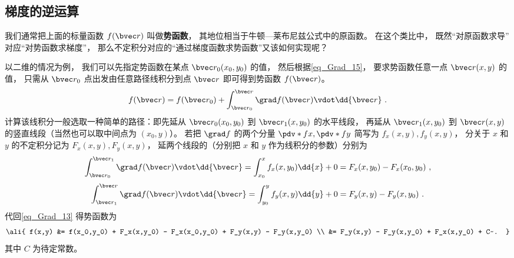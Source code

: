 \subsection{梯度的逆运算}

我们通常把上面的标量函数 $f(\bvec r)$ 叫做\textbf{势函数}， 其地位相当于牛顿—莱布尼兹公式中的原函数。 在这个类比中， 既然“对原函数求导” 对应“对势函数求梯度”， 那么不定积分对应的“通过梯度函数求势函数”又该如何实现呢？

以二维的情况为例， 我们可以先指定势函数在某点 $\bvec r_0 (x_0,y_0)$ 的值， 然后根据\autoref{eq_Grad_15}， 要求势函数任意一点 $\bvec r (x,y)$ 的值， 只需从 $\bvec r_0$ 点出发由任意路径线积分到点 $\bvec r$ 即可得到势函数 $f(\bvec r)$。
\begin{equation}\label{eq_Grad_13}
f(\bvec r) =  f(\bvec r_0) + \int_{\bvec r_0}^{\bvec r} \grad f(\bvec r) \vdot \dd{\bvec r} ~.
\end{equation}
计算该线积分一般选取一种简单的路径：即先延从 $\bvec r_0(x_0,y_0)$ 到 $\bvec r_1(x, y_0)$ 的水平线段， 再延从 $\bvec r_1(x, y_0)$ 到 $\bvec r(x,y)$ 的竖直线段（当然也可以取中间点为 $(x_0,y)$）。 若把 $\grad f$ 的两个分量 $\pdv*{f}{x}, \pdv*{f}{y}$ 简写为 $f_x(x,y), f_y(x,y)$， 分关于 $x$ 和 $y$ 的不定积分记为 $F_x(x,y), F_y(x,y)$， 延两个线段的（分别把 $x$ 和 $y$ 作为线积分的参数）分别为
\begin{equation}
 \int_{\bvec r_0}^{\bvec r_1} \grad f(\bvec r) \vdot \dd{\bvec r} = \int_{x_0}^{x} f_x(x,y_0) \dd{x} + 0 = F_x(x,y_0) - F_x(x_0,y_0)~,
\end{equation}
\begin{equation}
 \int_{\bvec r_1}^{\bvec r} \grad f(\bvec r) \vdot \dd{\bvec r} = \int_{y_0}^{y} f_y(x,y) \dd{y} + 0 = F_y(x,y) - F_y(x,y_0)~.
\end{equation}
代回\autoref{eq_Grad_13} 得势函数为
\begin{equation}\label{eq_Grad_23}\ali{
f(x,y) &= f(x_0,y_0) + F_x(x,y_0) - F_x(x_0,y_0) + F_y(x,y) - F_y(x,y_0) \\
&= F_y(x,y) - F_y(x,y_0) + F_x(x,y_0) + C~.
}\end{equation}
其中 $C$ 为待定常数。
